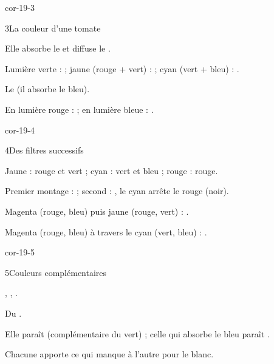\begin{blocLivre}{cor-19-3}
\begin{corrige}{3}{La couleur d'une tomate}
\begin{questions}
\item Elle absorbe le  et diffuse le .
\item Lumière verte :  ; jaune (rouge + vert) :  ; cyan (vert + bleu) : .
\item Le  (il absorbe le bleu).
\item En lumière rouge :  ; en lumière bleue : .
\end{questions}
\end{corrige}
\end{blocLivre}
\begin{blocLivre}{cor-19-4}
\begin{corrige}{4}{Des filtres successifs}
\begin{questions}
\item Jaune : rouge et vert ; cyan : vert et bleu ; rouge : rouge.
\item Premier montage :  ; second : , le cyan arrête le rouge (noir).
\item Magenta (rouge, bleu) puis jaune (rouge, vert) : .
\item Magenta (rouge, bleu) à travers le cyan (vert, bleu) : .
\end{questions}
\end{corrige}
\end{blocLivre}
\begin{blocLivre}{cor-19-5}
\begin{corrige}{5}{Couleurs complémentaires}
\begin{questions}
\item {}, , .
\item Du .
\item Elle paraît  (complémentaire du vert) ; celle qui absorbe le bleu paraît .
\item Chacune apporte ce qui manque à l'autre pour  le blanc.
\end{questions}
\end{corrige}
\end{blocLivre}
